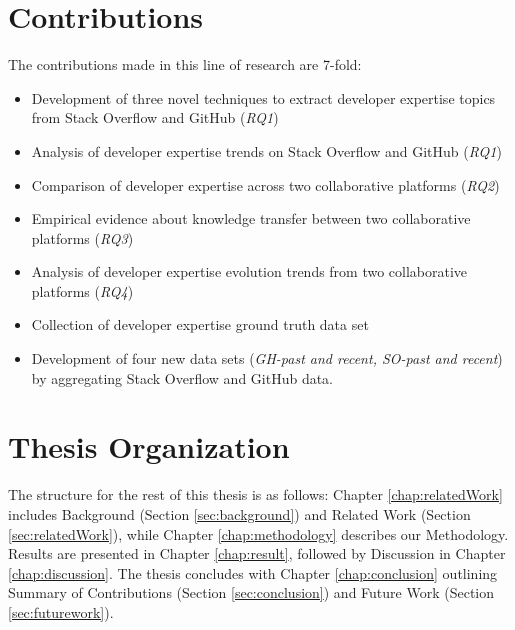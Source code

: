     \section{Contributions\label{sec:contribution}}
        The contributions made in this line of research are 7-fold:
        \begin{itemize}
            \item Development of three novel techniques to extract developer expertise topics from Stack Overflow and GitHub (\emph{RQ1})
            \item Analysis of developer expertise trends on Stack Overflow and GitHub (\emph{RQ1})
            \item Comparison of developer expertise across two collaborative platforms (\emph{RQ2})
            \item Empirical evidence about knowledge transfer between two collaborative platforms (\emph{RQ3})
            \item Analysis of developer expertise evolution trends from two collaborative platforms (\emph{RQ4})
            \item Collection of developer expertise ground truth data set
            \item Development of four new data sets (\emph{GH-past and recent, SO-past and recent}) by aggregating Stack Overflow and GitHub data.
        \end{itemize}
    
     \section{Thesis Organization\label{sec:thesis_structure}}
        The structure for the rest of this thesis is as follows: Chapter \ref{chap:relatedWork} includes Background (Section \ref{sec:background}) and Related Work (Section \ref{sec:relatedWork}), while Chapter \ref{chap:methodology} describes our Methodology. Results are presented in Chapter \ref{chap:result}, followed by Discussion in Chapter \ref{chap:discussion}. The thesis concludes with Chapter \ref{chap:conclusion} outlining Summary of Contributions (Section \ref{sec:conclusion}) and Future Work (Section \ref{sec:futurework}).\